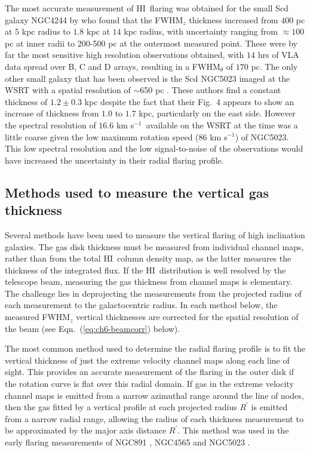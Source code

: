 \documentclass[traditabstract]{aa} %
\newcommand\HI{H{\small I}}
\newcommand\kms{km s$^{-1}$}
\begin{document}
The most accurate measurement of \HI\ flaring was obtained for the
small Scd galaxy NGC4244 by \citet{olling1996a} who found that the
FWHM$_z$ thickness increased from $400$ pc at $5$ kpc radius to $1.8$
kpc at $14$ kpc radius, with uncertainty ranging from $\approx 100$ pc
at inner radii to 200-500 pc at the outermost measured point. These
were by far the most sensitive high resolution observations obtained,
with $14$ hrs of VLA data spread over B, C and D arrays, resulting in
a FWHM$_{\theta}$ of $170$ pc. The only other small galaxy that has been
observed is the Scd NGC5023 imaged at the WSRT with a spatial
resolution of $\sim$650 pc \citep{bsvdk1986}. These authors
find a constant thickness of $1.2\pm 0.3$ kpc despite the fact that
their Fig.~4 appears to show an increase of thickness from $1.0$ to
$1.7$ kpc, particularly on the east side. However the spectral
resolution of $16.6$ \kms\ available on the WSRT at the time was
a little coarse given the low maximum rotation speed ($86$ \kms) of
NGC5023. This low spectral resolution and the low signal-to-noise of
the observations would have increased the uncertainty in their radial
flaring profile.


\subsection{Methods used to measure the vertical gas thickness}
\label{sec:prev-flare-methods}

Several methods have been used to measure the vertical flaring of high
inclination galaxies. The gas disk thickness must be measured from
individual channel maps, rather than from the total \HI\ column density
map, as the latter measures the thickness of the integrated flux.
If the \HI\ distribution is well resolved by the telescope beam,
measuring the gas thickness from channel maps is elementary. The
challenge lies in deprojecting the measurements from the projected
radius of each measurement to the galactocentric radius. In each
method below, the measured FWHM$_z$ vertical thicknesses are corrected
for the spatial resolution of the beam (see
Eqn.~(\ref{eq:ch6-beamcorr}) below).

The most common method used to determine the radial flaring profile is
to fit the vertical thickness of just the extreme velocity channel
maps along each line of sight. This provides an accurate measurement of the flaring in the outer disk if 
the rotation curve is flat over this radial domain.  If gas in the extreme velocity channel maps is emitted from a
narrow azimuthal range around the line of nodes, then the gas fitted
by a vertical profile at each projected radius $R^{\prime}$ is emitted
from a narrow radial range, allowing the radius of each thickness
measurement to be approximated by the major axis distance
$R^{\prime}$. This method was used in the early flaring
measurements of NGC891 \citep{sa1979,rupen1989}, NGC4565
\citep{rupen1989} and NGC5023 \citep{bsvdk1986}.
\end{document}
